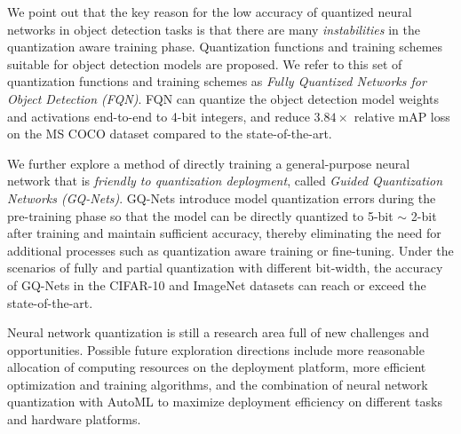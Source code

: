 We point out that the key reason for the low accuracy of quantized neural networks in object detection tasks is that there are many \emph{instabilities} in the quantization aware training phase. Quantization functions and training schemes suitable for object detection models are proposed. We refer to this set of quantization functions and training schemes as \emph{Fully Quantized Networks for Object Detection (FQN)}. FQN can quantize the object detection model weights and activations end-to-end to 4-bit integers, and reduce $3.84\times$ relative mAP loss on the MS COCO dataset compared to the state-of-the-art.

We further explore a method of directly training a general-purpose neural network that is \emph{friendly to quantization deployment}, called \emph{Guided Quantization Networks (GQ-Nets)}. GQ-Nets introduce model quantization errors during the pre-training phase so that the model can be directly quantized to 5-bit $\sim$ 2-bit after training and maintain sufficient accuracy, thereby eliminating the need for additional processes such as quantization aware training or fine-tuning. Under the scenarios of fully and partial quantization with different bit-width, the accuracy of GQ-Nets in the CIFAR-10 and ImageNet datasets can reach or exceed the state-of-the-art.

Neural network quantization is still a research area full of new challenges and opportunities. Possible future exploration directions include more reasonable allocation of computing resources on the deployment platform, more efficient optimization and training algorithms, and the combination of neural network quantization with AutoML to maximize deployment efficiency on different tasks and hardware platforms.

